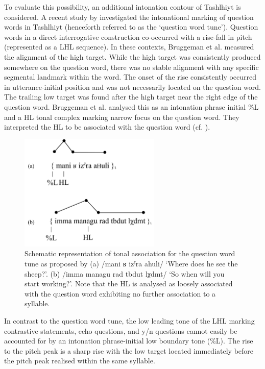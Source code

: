 To evaluate this possibility, an additional intonation contour of Tashlhiyt is considered. A recent study by \citet{Bruggeman.etal2017} investigated the intonational marking of question words in Tashlhiyt (henceforth referred to as the ‘question word tune’). Question words in a direct interrogative construction co-occurred with a rise-fall in pitch (represented as a LHL sequence). In these contexts, Bruggeman et al. measured the alignment of the high target. While the high target was consistently produced somewhere on the question word, there was no stable alignment with any specific segmental landmark within the word. The onset of the rise consistently occurred in utterance-initial position and was not necessarily located on the question word. The trailing low target was found after the high target near the right edge of the question word. Bruggeman et al. analysed this as an intonation phrase initial \%L and a HL tonal complex marking narrow focus on the question word. They interpreted the HL to be associated with the question word (cf. ). 

  \begin{figure}[h!]
  \centering 
   \includegraphics[width=0.6\textwidth]{figures/Figure_7_2.png}
  \caption{Schematic representation of tonal association for the question word tune as proposed by \citet{Bruggeman.etal2017} (a) /mani ʁ izˤra ahuli/ ‘Where does he see the sheep?’. (b) /imma managu rad tbdut lχdmt/ ‘So when will you start working?’. Note that the HL is analysed as loosely associated with the question word exhibiting no further association to a syllable.}
   \label{fig:7.2}
   \end{figure}
   
In contrast to the question word tune, the low leading tone of the LHL marking contrastive statements, echo questions, and y/n questions cannot easily be accounted for by an intonation phrase-initial low boundary tone (\%L). The rise to the pitch peak is a sharp rise with the low target located immediately before the pitch peak realised within the same syllable. 

